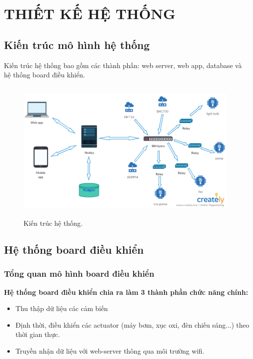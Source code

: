 \documentclass[a4paper,12pt,oneside]{article}
\begin{document}
\newpage
\section{THIẾT KẾ HỆ THỐNG}
\subsection{Kiến trúc mô hình hệ thống}
\noindent Kiến trúc hệ thống bao gồm các thành phần: web server, web app, database và hệ thống board điều khiển. 
\begin{center}
\begin{figure}[h]
\begin{center}
\includegraphics[height=7cm,width=11cm]{hinh/system.png}
\end{center}
\caption{Kiến trúc hệ thống.}
\end{figure}
\end{center}

\subsection{Hệ thống board điều khiển}

\subsubsection{Tổng quan mô hình board điều khiển}

\noindent \textbf{Hệ thống board điều khiển chia ra làm 3 thành phần chức năng chính:}
\begin{itemize}
\item Thu thập dữ liệu các cảm biến 
\item Định thời, điều khiển các actuator (máy bơm, xục oxi, đèn chiếu sáng...) theo thời gian thực.
\item Truyền nhận dữ liệu với web-server thông qua môi trường wifi.

\end{itemize}
\end{document}
